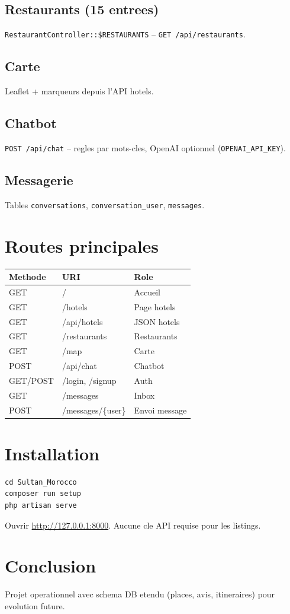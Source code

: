 \documentclass[12pt,a4paper,oneside]{report}
\begin{document}
\section{Restaurants (15 entrees)}
\texttt{RestaurantController::\$RESTAURANTS} -- \texttt{GET /api/restaurants}.

\section{Carte}
Leaflet + marqueurs depuis l'API hotels.

\section{Chatbot}
\texttt{POST /api/chat} -- regles par mots-cles, OpenAI optionnel (\texttt{OPENAI\_API\_KEY}).

\section{Messagerie}
Tables \texttt{conversations}, \texttt{conversation\_user}, \texttt{messages}.

\chapter{Routes principales}
\begin{tabular}{@{}lll@{}}
\toprule
Methode & URI & Role \\
\midrule
GET & / & Accueil \\
GET & /hotels & Page hotels \\
GET & /api/hotels & JSON hotels \\
GET & /restaurants & Restaurants \\
GET & /map & Carte \\
POST & /api/chat & Chatbot \\
GET/POST & /login, /signup & Auth \\
GET & /messages & Inbox \\
POST & /messages/\{user\} & Envoi message \\
\bottomrule
\end{tabular}

\chapter{Installation}
\begin{lstlisting}
cd Sultan_Morocco
composer run setup
php artisan serve
\end{lstlisting}
Ouvrir \url{http://127.0.0.1:8000}. Aucune cle API requise pour les listings.

\chapter{Conclusion}
Projet operationnel avec schema DB etendu (places, avis, itineraires) pour evolution future.
\end{document}
